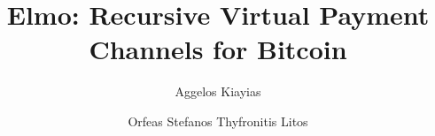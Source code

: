 \title{Elmo: Recursive Virtual Payment Channels for Bitcoin}
\author{Aggelos Kiayias \and Orfeas Stefanos Thyfronitis Litos}
\maketitle
